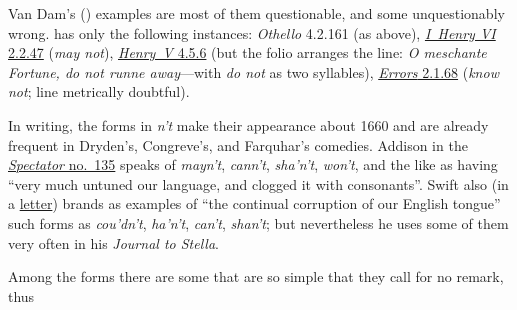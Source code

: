 Van Dam's (\citeyear[\href{https://archive.org/details/williamshakespea00dambrich/page/154/mode/2up?view=theater}{155}]{vandam1900william}) examples 
are most of them questionable, and some unquestionably wrong. \citet[\href{https://archive.org/details/der-vers-in-shaksperes-dramen/page/n47/mode/2up?view=theater}{39}]{konig1888vers} 
has only the following instances: \textit{Othello} 4.2.161 (as  above), \href{https://internetshakespeare.uvic.ca/doc/1H6_F1/scene/2.2/index.html#tln-815}{\textit{I~Henry VI} 2.2.47} (\textit{may not}), \href{https://internetshakespeare.uvic.ca/doc/H5_F1/scene/4.5/index.html#tln-2460}{\textit{Henry~V} 4.5.6} (but the folio arranges the line: \textit{O meschante Fortune, do not runne away}---with \textit{do not} as two syllables), %
\href{https://internetshakespeare.uvic.ca/doc/Err_F1/scene/2.1/index.html#tln-345}{\textit{Errors} 2.1.68} (\textit{know not}; line metrically doubtful).

In writing, the forms in \textit{n't} make their appearance about 1660 and are already frequent in Dryden's, Congreve's, and Farquhar's comedies. Addison in the \href{https://archive.org/details/spectatornewedre00addiuoft/page/202/mode/2up?q=%22very+much+untuned%22&view=theater}{\textit{Spectator} no.~135} speaks of \textit{mayn't}, \textit{cann't}, \textit{sha'n't}, \textit{won't}, and the like as having ``very much untuned our language, and clogged it with consonants''. %
Swift also (in a \href{https://en.wikisource.org/wiki/Page%3AThe_Works_of_the_Rev._Jonathan_Swift%2C_Volume_5.djvu/202}{letter}) brands as examples of ``the continual corruption of our English tongue'' such forms as \textit{cou'dn't}, \textit{ha'n't}, \textit{can't}, \textit{shan't}; but nevertheless he uses some of them very often in his \textit{Journal to Stella}. 

Among the forms there are some that are so simple that they call for no remark, thus

\phantom{a}

